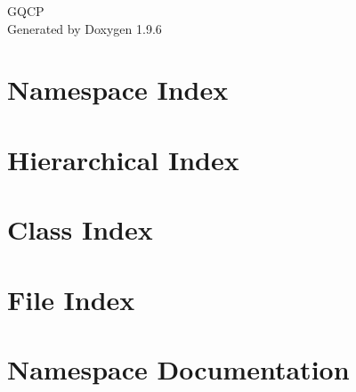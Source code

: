 \documentclass[twoside]{book}
\newcommand{\+}{\discretionary{\mbox{\scriptsize$\hookleftarrow$}}{}{}}
\newcommand{\clearemptydoublepage}{%
    \newpage{\pagestyle{empty}\cleardoublepage}%
  }
\begin{document}
  \raggedbottom
    \hypersetup{pageanchor=false,
                bookmarksnumbered=true,
                pdfencoding=unicode
               }
  \begin{titlepage}
  \vspace*{7cm}
  \begin{center}%
  {\Large GQCP}\\
  \vspace*{1cm}
  {\large Generated by Doxygen 1.9.6}\\
  \end{center}
  \end{titlepage}
  \clearemptydoublepage
  \tableofcontents
  \clearemptydoublepage
  \hypersetup{pageanchor=true}
\chapter{Namespace Index}

\chapter{Hierarchical Index}

\chapter{Class Index}

\chapter{File Index}

\chapter{Namespace Documentation}















\end{document}
